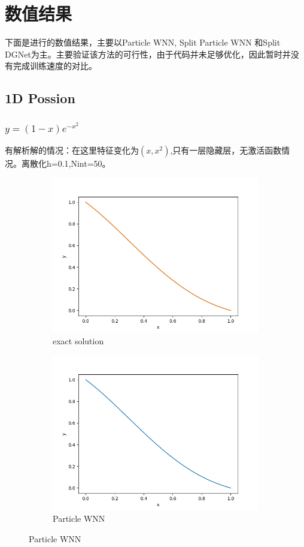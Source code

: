 \chapter{数值结果}
下面是进行的数值结果，主要以Particle WNN, Split Particle WNN 和Split DGNet为主。主要验证该方法的可行性，由于代码并未足够优化，因此暂时并没有完成训练速度的对比。
\section{1D Possion}
\subsection*{$y = (1-x)e^{-x^2}$}
有解析解的情况：在这里特征变化为$(x,x^2)$,只有一层隐藏层，无激活函数情况。离散化h=0.1,Nint=50。
\begin{figure}[H]
    \centering  
    \begin{subfigure}{0.5\textwidth}  
        \centering  
        \includegraphics[width=0.9\linewidth]{./pics/final/possion/dgnet1d/exact1.png}  
        \caption{exact solution}  
    \end{subfigure}%
    \begin{subfigure}{0.5\textwidth}  
        \centering  
        \includegraphics[width=0.9\linewidth]{./pics/final/possion/dgnet1d/pwnn1.png}  
        \caption{Particle WNN}
    \end{subfigure}  


\end{figure}
